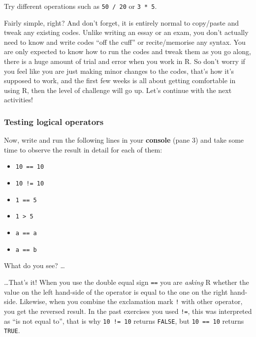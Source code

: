 \documentclass[
]{book}
\providecommand{\tightlist}{%
  \setlength{\itemsep}{0pt}\setlength{\parskip}{0pt}}
\begin{document}
Try different operations such as \texttt{50\ /\ 20} or \texttt{3\ *\ 5}.

Fairly simple, right? And don't forget, it is entirely normal to copy/paste and tweak any existing codes. Unlike writing an essay or an exam, you don't actually need to know and write codes ``off the cuff'' or recite/memorise any syntax. You are only expected to know how to run the codes and tweak them as you go along, there is a huge amount of trial and error when you work in R. So don't worry if you feel like you are just making minor changes to the codes, that's how it's supposed to work, and the first few weeks is all about getting comfortable in using R, then the level of challenge will go up. Let's continue with the next activities!

\hypertarget{testing-logical-operators}{%
\subsubsection{Testing logical operators}\label{testing-logical-operators}}

Now, write and run the following lines in your \textbf{console} (pane 3) and take some time to observe the result in detail for each of them:

\begin{itemize}
\tightlist
\item
  \texttt{10\ ==\ 10}
\item
  \texttt{10\ !=\ 10}
\item
  \texttt{1\ ==\ 5}
\item
  \texttt{1\ \textgreater{}\ 5}
\item
  \texttt{\textquotesingle{}a\textquotesingle{}\ ==\ \textquotesingle{}a\textquotesingle{}}
\item
  \texttt{\textquotesingle{}a\textquotesingle{}\ ==\ \textquotesingle{}b\textquotesingle{}}
\end{itemize}

What do you see? \ldots{}

\ldots That's it! When you use the double equal sign \texttt{==} you are \emph{asking} R whether the value on the left hand-side of the operator is equal to the one on the right hand-side. Likewise, when you combine the exclamation mark \texttt{!} with other operator, you get the reversed result. In the past exercises you used \texttt{!=}, this was interpreted as ``is not equal to'', that is why \texttt{10\ !=\ 10} returns \texttt{FALSE}, but \texttt{10\ ==\ 10} returns \texttt{TRUE}.
\end{document}
